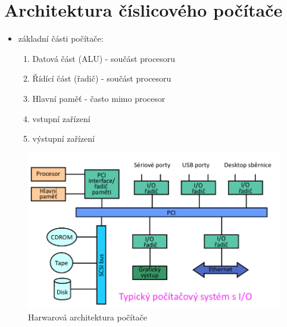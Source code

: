 \documentclass{szzclass}
\providecommand{\tightlist}{%
  \setlength{\itemsep}{0pt}\setlength{\parskip}{0pt}}
\begin{document}
    

\hypertarget{architektura-ux10duxedslicovuxe9ho-poux10duxedtaux10de}{%
\section{Architektura číslicového
počítače}\label{architektura-ux10duxedslicovuxe9ho-poux10duxedtaux10de}}

\begin{itemize}
\tightlist
\item
  základní části počítače:

  \begin{enumerate}
  \def\labelenumi{\arabic{enumi}.}
  \tightlist
  \item
    Datová část (ALU) - součást procesoru
  \item
    Řídící část (řadič) - součást procesoru
  \item
    Hlavní paměť - často mimo procesor
  \item
    vstupní zařízení
  \item
    výstupní zařízení
  \end{enumerate}
\end{itemize}

\begin{figure}[h]
\centering
\includegraphics[width=\textwidth]{topics/bi-spol-28/images/hw_architektura.png}
\caption{Harwarová architektura počítače}
\end{figure}
\end{document}
